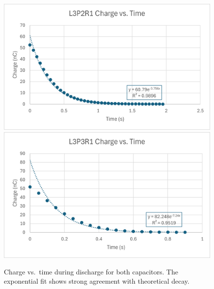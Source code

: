 \documentclass[11pt]{article}
\begin{document}
\begin{figure}[H]
    \centering
    \includegraphics[width=0.8\linewidth]{../figures/L3P2R1_QvT.png}\\
    \includegraphics[width=0.8\linewidth]{../figures/L3P3R1_QvT.png}
    \caption{Charge vs.\ time during discharge for both capacitors. The exponential fit shows strong agreement with theoretical decay.}
    \label{fig:QvT}
\end{figure}
\end{document}
